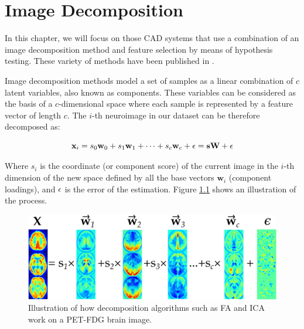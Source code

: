 \chapter{Image Decomposition}\label{ch:decomposition}

In this chapter, we will focus on those \ac{CAD} systems that use a combination of an image decomposition method and feature selection by means of hypothesis testing. These variety of methods have been published in \cite{Martinez201141,Martinez-Murcia20129676,Martinez-Murcia2013255,Martinez-Murcia201458}. 

Image decomposition methods model a set of samples as a linear combination of $c$ latent variables, also known as components. These variables can be considered as the basis of a $c$-dimensional space where each sample is represented by a feature vector of length $c$. The $i$-th neuroimage in our dataset can be therefore decomposed as: 

\begin{equation}\label{eq:generalDecomposition}
	\mathbf{x}_i = s_0 \mathbf{w}_0 + s_1 \mathbf{w}_1 + \dots + s_c \mathbf{w}_c + \boldmath\epsilon = \mathbf{s}\mathbf{W} + \boldmath\epsilon
\end{equation}

Where $s_i$ is the coordinate (or component score) of the current image in the $i$-th dimension of the new space defined by all the base vectors $\mathbf{w}_i$ (component loadings), and $\boldmath\epsilon$ is the error of the estimation. Figure \ref{fig:decomposition_overview} shows an illustration of the process. 

\begin{figure}[tph]
	\centering
	\includegraphics[width=0.9\linewidth]{Graphics/ch4/decomposition_overview}
	\caption[Illustration of how decomposition algorithms work.]{Illustration of how decomposition algorithms such as \ac{FA} and \ac{ICA} work on a \ac{PET}-FDG brain image.}
	\label{fig:decomposition_overview}
\end{figure}

